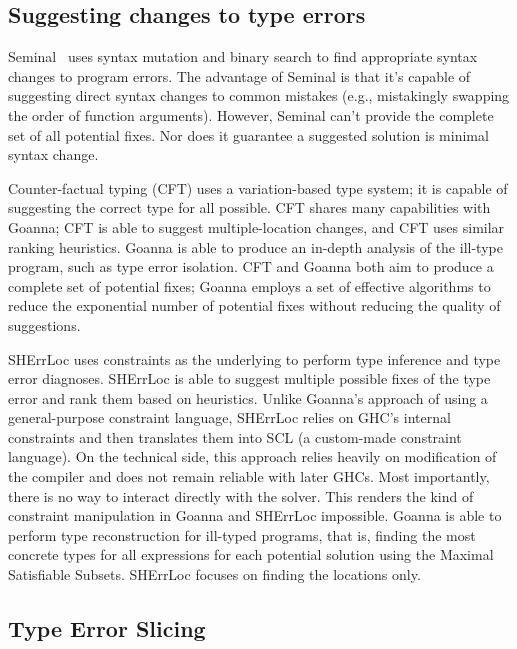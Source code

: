 \documentclass[pdflatex,lineno,sn-nature,Numbered]{sn-jnl}%
\begin{document}
\subsection{Suggesting changes to type errors}

Seminal~\cite{Lerner2007-yq} uses syntax mutation and binary search to find appropriate syntax changes to program errors. The advantage of Seminal is that it's capable of suggesting direct syntax changes to common mistakes (e.g., mistakingly swapping the order of function arguments). However, Seminal can't provide the complete set of all potential fixes. Nor does it guarantee a suggested solution is minimal syntax change.
   
   Counter-factual typing (CFT) \cite{Chen2014-dz,Chen2020-ad} uses a variation-based type system; it is capable of suggesting the correct type for all possible. CFT shares many capabilities with Goanna; CFT is able to suggest multiple-location changes, and CFT uses similar ranking heuristics. Goanna is able to produce an in-depth analysis of the ill-type program, such as type error isolation. CFT and Goanna both aim to produce a complete set of potential fixes; Goanna employs a set of effective algorithms to reduce the exponential number of potential fixes without reducing the quality of suggestions. 
   
   SHErrLoc \cite{Zhang2015-xy} uses constraints as the underlying to perform type inference and type error diagnoses. SHErrLoc is able to suggest multiple possible fixes of the type error and rank them based on heuristics. Unlike Goanna's approach of using a general-purpose constraint language, SHErrLoc relies on GHC's internal constraints and then translates them into SCL (a custom-made constraint language). On the technical side, this approach relies heavily on modification of the compiler and does not remain reliable with later GHCs. Most importantly, there is no way to interact directly with the solver. This renders the kind of constraint manipulation in Goanna and SHErrLoc impossible. Goanna is able to perform type reconstruction for ill-typed programs, that is, finding the most concrete types for all expressions for each potential solution using the Maximal Satisfiable Subsets. SHErrLoc focuses on finding the locations only.


\subsection{Type Error Slicing}
\end{document}
